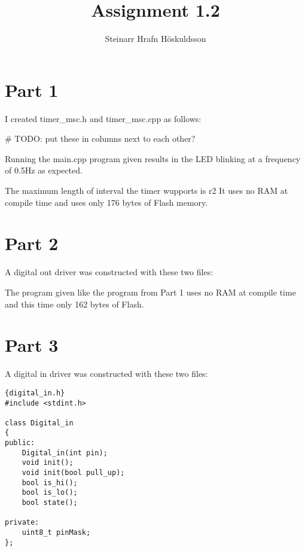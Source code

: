 \documentclass{article}
\title{Assignment 1.2}
\author{Steinarr Hrafn Höskuldsson}
\begin{document}
\pagestyle{firststyle}
{\let\newpage\relax\maketitle}
\section*{Part 1}
I created timer\_msc.h and timer\_msc.cpp as follows:





# TODO: put these in columns next to each other?

Running the main.cpp program given results in the LED blinking at a frequency of 0.5Hz as expected.

The maximum length of interval the timer wupports is r2
It uses no RAM at compile time and uses only 176 bytes of Flash memory.
\newpage
\section*{Part 2}
A digital out driver was constructed with these two files:


The program given like the program from Part 1 uses no RAM at compile time and this time only 162 bytes of Flash.
\newpage
\section*{Part 3}
A digital in driver was constructed with these two files:
\begin{lstlisting}{digital_in.h}
#include <stdint.h>

class Digital_in
{
public:
    Digital_in(int pin);
    void init();
    void init(bool pull_up);
    bool is_hi();
    bool is_lo();
    bool state();

private:
    uint8_t pinMask;
};

\end{lstlisting}
\end{document}
